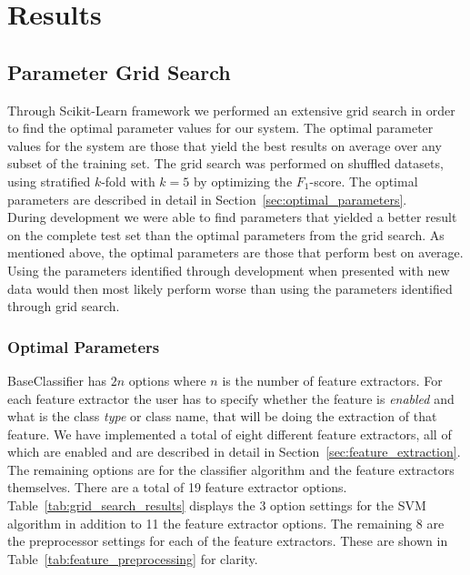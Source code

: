\chapter{Results}
\label{cha:results}

\section{Parameter Grid Search}
Through Scikit-Learn framework we performed an extensive grid search in order to find the optimal parameter values for our system. The optimal parameter values for the system are those that yield the best results on average over any subset of the training set. The grid search was performed on shuffled datasets, using stratified $k$-fold with $k=5$ by optimizing the $F_1$-score. The optimal parameters are described in detail in Section~\ref{sec:optimal_parameters}. \\

During development we were able to find parameters that yielded a better result on the complete test set than the optimal parameters from the grid search. As mentioned above, the optimal parameters are those that perform best on average. Using the parameters identified through development when presented with new data would then most likely perform worse than using the parameters identified through grid search. 

\subsection*{Optimal Parameters}
\label{sec:optimal_parameters}
BaseClassifier has $2n$ options where $n$ is the number of feature extractors. For each feature extractor the user has to specify whether the feature is \textit{enabled} and what is the class \textit{type} or class name, that will be doing the extraction of that feature. We have implemented a total of eight different feature extractors, all of which are enabled and are described in detail in Section~\ref{sec:feature_extraction}. \\

The remaining options are for the classifier algorithm and the feature extractors themselves. There are a total of 19 feature extractor options. Table~\ref{tab:grid_search_results} displays the 3 option settings for the SVM algorithm in addition to 11 the feature extractor options. The remaining 8 are the preprocessor settings for each of the feature extractors. These are shown in Table~\ref{tab:feature_preprocessing} for clarity. \\


